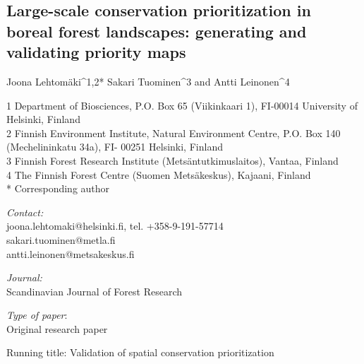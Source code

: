 \documentclass[]{article}
\author{}
\date{}
\begin{document}
\subsection{Large-scale conservation prioritization in boreal forest
landscapes: generating and validating priority maps}

Joona Lehtomäki\^{}1,2* Sakari Tuominen\^{}3 and Antti Leinonen\^{}4

1 Department of Biosciences, P.O. Box 65 (Viikinkaari 1), FI-00014
University of Helsinki, Finland\\2 Finnish Environment Institute,
Natural Environment Centre, P.O. Box 140 (Mechelininkatu 34a), FI- 00251
Helsinki, Finland\\3 Finnish Forest Research Institute
(Metsäntutkimuslaitos), Vantaa, Finland\\4 The Finnish Forest Centre
(Suomen Metsäkeskus), Kajaani, Finland\\* Corresponding author

\emph{Contact:}\\joona.lehtomaki@helsinki.fi, tel.
+358-9-191-57714\\sakari.tuominen@metla.fi\\antti.leinonen@metsakeskus.fi

\emph{Journal:}\\Scandinavian Journal of Forest Research

\emph{Type of paper}:\\Original research paper

Running title: Validation of spatial conservation prioritization
\end{document}
